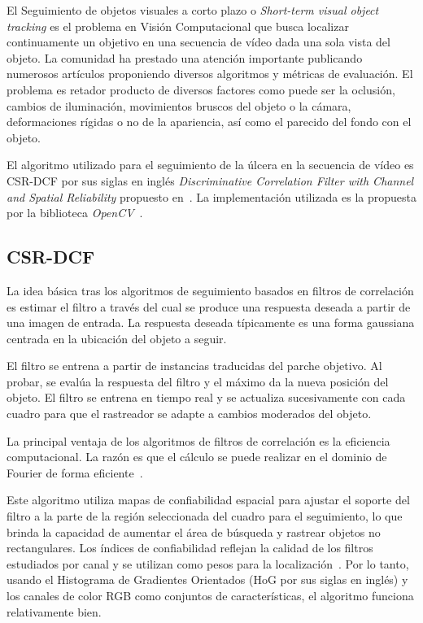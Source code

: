 El Seguimiento de objetos visuales a corto plazo o \textit{Short-term visual object tracking} es el problema en Visión Computacional que busca localizar continuamente un objetivo en una secuencia de vídeo dada una sola vista del objeto. La comunidad ha prestado una atención importante publicando numerosos artículos proponiendo diversos algoritmos y métricas de evaluación. El problema es retador producto de diversos factores como puede ser la oclusión, cambios de iluminación, movimientos bruscos del objeto o la cámara, deformaciones rígidas o no de la apariencia, así como el parecido del fondo con el objeto.	

El algoritmo utilizado para el seguimiento de la úlcera en la secuencia de vídeo es CSR-DCF por sus siglas en inglés \textit{Discriminative Correlation Filter with Channel and Spatial Reliability} propuesto en~\cite{lunevzivc2018discriminative}. La implementación utilizada es la propuesta por la biblioteca \textit{OpenCV}~\cite{bradski2000opencv}.

\subsection{CSR-DCF}\label{sec:csr}

La idea básica tras los algoritmos de seguimiento basados en filtros de correlación es estimar el filtro a través del cual se produce una respuesta deseada a partir de una imagen de entrada. La respuesta deseada típicamente es una forma gaussiana centrada en la ubicación del objeto a seguir.

El filtro se entrena a partir de instancias traducidas del parche objetivo. Al probar, se evalúa la respuesta del filtro y el máximo da la nueva posición del objeto. El filtro se entrena en tiempo real y se actualiza sucesivamente con cada cuadro para que el rastreador se adapte a cambios moderados del objeto.

La principal ventaja de los algoritmos de filtros de correlación es la eficiencia computacional. La razón es que el cálculo se puede realizar en el dominio de Fourier de forma eficiente~\cite{henriques2014high}. 

Este algoritmo utiliza mapas de confiabilidad espacial para ajustar el soporte del filtro a la parte de la región seleccionada del cuadro para el seguimiento, lo que brinda la capacidad de aumentar el área de búsqueda y rastrear objetos no rectangulares. Los índices de confiabilidad reflejan la calidad de los filtros estudiados por canal y se utilizan como pesos para la localización~\cite{lunevzivc2018discriminative}. Por lo tanto, usando el Histograma de Gradientes Orientados (HoG por sus siglas en inglés) y los canales de color RGB como conjuntos de características, el algoritmo funciona relativamente bien.


